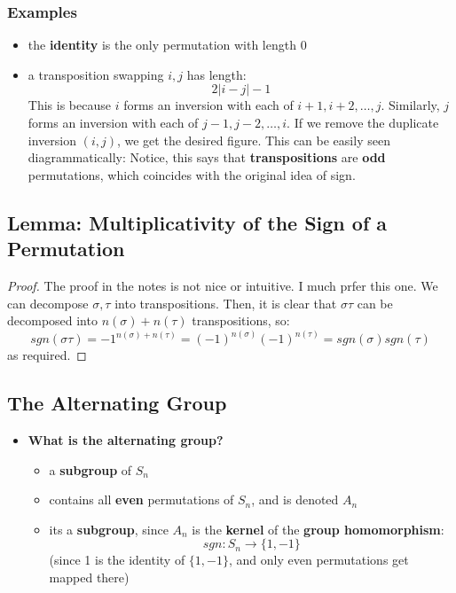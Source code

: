 \documentclass{exam}
\begin{document}
\subsubsection{Examples}

\begin{itemize}
    \item the \textbf{identity} is the only permutation with length 0
    \item a transposition swapping $i,j$ has length:
    \[
    2|i-j| - 1
    \]
    This is because $i$ forms an inversion with each of $i+1,i+2, \ldots, j$. Similarly, $j$ forms an inversion with each of $j-1, j-2, \ldots, i$. If we remove the duplicate inversion $(i,j)$, we get the desired figure. This can be easily seen diagrammatically:
    Notice, this says that \textbf{transpositions} are \textbf{odd} permutations, which coincides with the original idea of sign.
\end{itemize}

\subsection{Lemma: Multiplicativity of the Sign of a Permutation}


\begin{proof}

The proof in the notes is not nice or intuitive. I much prfer this one. We can decompose $\sigma, \tau$ into transpositions. Then, it is clear that $\sigma \tau$ can be decomposed into $n(\sigma) + n(\tau)$ transpositions, so:
\[
sgn(\sigma \tau) = -1^{n(\sigma) + n(\tau)} = (-1)^{n(\sigma)}(-1)^{n(\tau)} = sgn(\sigma)sgn(\tau)
\]
as required.

\end{proof}

\subsection{The Alternating Group}

\begin{itemize}
    \item \textbf{What is the alternating group?}
    \begin{itemize}
        \item a \textbf{subgroup} of $S_n$
        \item contains all \textbf{even} permutations of $S_n$, and is denoted $A_n$
        \item its a \textbf{subgroup}, since $A_n$ is the \textbf{kernel} of the \textbf{group homomorphism}:
        \[
        sgn : S_n \to \{1,-1\}
        \]
        (since 1 is the identity of $\{1,-1\}$, and only even permutations get mapped there)
    \end{itemize}
\end{itemize}
\end{document}
